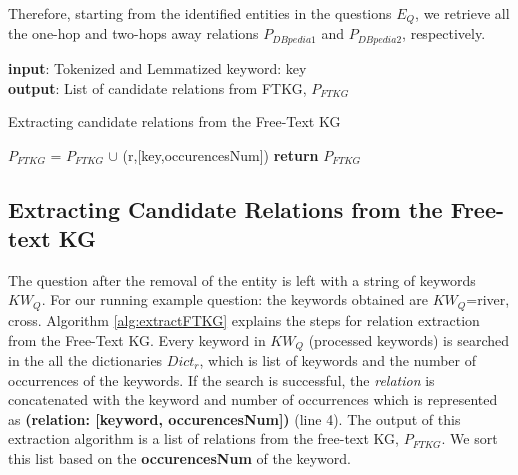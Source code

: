 \begin{sloppypar}
Therefore, starting from the identified entities in the questions $E_{Q}$, we retrieve all the one-hop and two-hops away relations $P_{DBpedia1}$ and $P_{DBpedia2}$, respectively.


\begin{singlespace}
\begin{algorithm}
 \hspace*{\algorithmicindent} \textbf{input}: Tokenized and Lemmatized keyword: key  \\
 \hspace*{\algorithmicindent} \textbf{output}: List of candidate relations from FTKG, $P_{FTKG}$
\begin{algorithmic}[1]
\caption{Extracting candidate relations from the Free-Text KG}\label{alg:extractFTKG}
            \State $P_{FTKG}$ = $P_{FTKG}$ $\cup$ (r,[key,occurencesNum])
        \EndIf
\EndFor
\EndFor
\State \textbf{return} $P_{FTKG}$
\end{algorithmic}
\end{algorithm}
\end{singlespace}

\subsection{Extracting Candidate Relations from the Free-text KG}
\label{sec:extractftkgrelations}
The question after the removal of the entity is left with a string of keywords $KW_{Q}$. For our running example question: the keywords obtained are $KW_{Q}$={\selectfont river, cross}. Algorithm \ref{alg:extractFTKG} explains the steps for relation extraction from the Free-Text KG. Every keyword in $KW_{Q}$ (processed keywords) is searched in the all the dictionaries $Dict_{r}$, which is list of keywords and the number of occurrences of the keywords. If the search is successful, the \textit{relation} is concatenated with the keyword and number of occurrences which is represented as \textbf{(relation: [keyword, occurencesNum])} (line 4). The output of this extraction algorithm is a list of relations from the free-text KG, $P_{FTKG}$. We sort this list based on the \textbf{occurencesNum} of the keyword.


\end{sloppypar}
